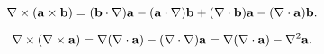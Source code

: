 \begin{theorem}
\[ \nabla\times( {\bf a}\times {\bf b}) = ({\bf b}\cdot \nabla){\bf a} - ({\bf a}\cdot \nabla){\bf b} + (\nabla\cdot{\bf b}) {\bf a} -  (\nabla\cdot{\bf a}) {\bf b}. \]  
\end{theorem}

\begin{theorem}
\[ \nabla\times( \nabla \times {\bf a}) = \nabla (\nabla \cdot {\bf a})  -  (\nabla\cdot \nabla) {\bf a} =  \nabla (\nabla \cdot {\bf a})  -  \nabla^2{\bf a}.\]  
\end{theorem}